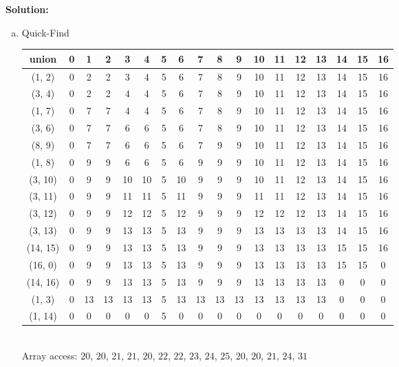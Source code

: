 \documentclass{article}\usepackage{amsmath,amssymb,amsthm,tikz,tkz-graph,color,chngpage,soul,hyperref,csquotes,graphicx,floatrow}\newcommand*{\QEDB}{\hfill\ensuremath{\square}}\newtheorem*{prop}{Proposition}\renewcommand{\theenumi}{\alph{enumi}}\usepackage[shortlabels]{enumitem}\usepackage[nobreak=true]{mdframed}\usetikzlibrary{matrix,calc}\MakeOuterQuote{"}\usepackage[margin=0.75in]{geometry} \newtheorem{theorem}{Theorem}
\begin{document}
\begin{mdframed}
\textbf{Solution:} %
\begin{enumerate}[a.]
\item Quick-Find \\
\begin{tabular}{|c|c|c|c|c|c|c|c|c|c|c|c|c|c|c|c|c|c|}
\hline
union & 0 &1 & 2 & 3 & 4 & 5 & 6 & 7 & 8 & 9 & 10 & 11 & 12 & 13 & 14 & 15 & 16 \\
\hline
(1, 2) & 0 & 2 & 2 & 3 & 4 & 5 & 6 & 7 & 8 & 9 & 10 & 11 & 12 & 13 & 14 & 15 & 16 \\
\hline
(3, 4) & 0 & 2 & 2 & 4 & 4 & 5 & 6 & 7 & 8 & 9 & 10 & 11 & 12 & 13 & 14 & 15 & 16 \\
\hline
(1, 7) & 0 & 7 & 7 & 4 & 4 & 5 & 6 & 7 & 8 & 9 & 10 & 11 & 12 & 13 & 14 & 15 & 16 \\
\hline
(3, 6) & 0 & 7 & 7 & 6 & 6 & 5 & 6 & 7 & 8 & 9 & 10 & 11 & 12 & 13 & 14 & 15 & 16 \\
\hline
(8, 9) & 0 & 7 & 7 & 6 & 6 & 5 & 6 & 7 & 9 & 9 & 10 & 11 & 12 & 13 & 14 & 15 & 16 \\
\hline
(1, 8) & 0 & 9 & 9 & 6 & 6 & 5 & 6 & 9 & 9 & 9 & 10 & 11 & 12 & 13 & 14 & 15 & 16 \\
\hline
(3, 10) & 0 & 9 & 9 & 10 & 10 & 5 & 10 & 9 & 9 & 9 & 10 & 11 & 12 & 13 & 14 & 15 & 16 \\
\hline
(3, 11) & 0 & 9 & 9 & 11 & 11 & 5 & 11 & 9 & 9 & 9 & 11 & 11 & 12 & 13 & 14 & 15 & 16 \\
\hline
(3, 12) & 0 & 9 & 9 & 12 & 12 & 5 & 12 & 9 & 9 & 9 & 12 & 12 & 12 & 13 & 14 & 15 & 16 \\
\hline
(3, 13) & 0 & 9 & 9 & 13 & 13 & 5 & 13 & 9 & 9 & 9 & 13 & 13 & 13 & 13 & 14 & 15 & 16 \\
\hline
(14, 15) & 0 & 9 & 9 & 13 & 13 & 5 & 13 & 9 & 9 & 9 & 13 & 13 & 13 & 13 & 15 & 15 & 16 \\
\hline
(16, 0) & 0 & 9 & 9 & 13 & 13 & 5 & 13 & 9 & 9 & 9 & 13 & 13 & 13 & 13 & 15 & 15 & 0 \\
\hline
(14, 16) & 0 & 9 & 9 & 13 & 13 & 5 & 13 & 9 & 9 & 9 & 13 & 13 & 13 & 13 & 0 & 0 & 0 \\
\hline
(1, 3) & 0 & 13 & 13 & 13 & 13 & 5 & 13 & 13 & 13 & 13 & 13 & 13 & 13 & 13 & 0 & 0 & 0 \\
\hline
(1, 14) & 0 & 0 & 0 & 0 & 0 & 5 & 0 & 0 & 0 & 0 & 0 & 0 & 0 & 0 & 0 & 0 & 0 \\
\hline
\end{tabular}
\\ Array access: $20$, $20$, $21$, $21$, $20$, $22$, $22$, $23$, $24$, $25$, $20$, $20$, $21$, $24$, $31$

\end{enumerate}
\end{mdframed}
\end{document}
